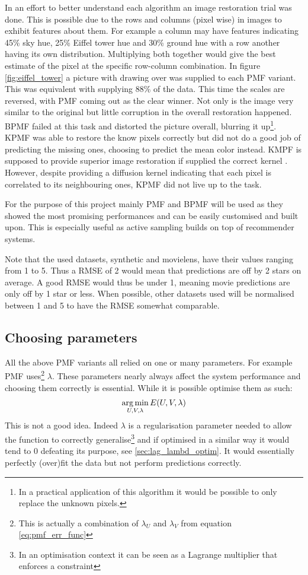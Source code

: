 In an effort to better understand each algorithm an image restoration trial was done. This is possible due to the rows and columns (pixel wise) in images to exhibit features about them. For example a column may have features indicating 45\% sky hue, 25\% Eiffel tower hue and 30\% ground hue with a row another having its own distribution. Multiplying both together would give the best estimate of the pixel at the specific row-column combination.
In figure \ref{fig:eiffel_tower} a picture with drawing over was supplied to each PMF variant. This was equivalent with supplying 88\% of the data. This time the scales are reversed, with PMF coming out as the clear winner. Not only is the image very similar to the original but little corruption in the overall restoration happened. BPMF failed at this task and distorted the picture overall, blurring it up\footnote{In a practical application of this algorithm it would be possible to only replace the unknown pixels.}. KPMF was able to restore the know pixels correctly but did not do a good job of predicting the missing ones, choosing to predict the mean color instead. KMPF is supposed to provide superior image restoration if supplied the correct kernel \cite{kpmf}. However, despite providing a diffusion kernel indicating that each pixel is correlated to its neighbouring ones, KPMF did not live up to the task.


For the purpose of this project mainly PMF and BPMF will be used as they showed the most promising performances and can be easily customised and built upon. This is especially useful as active sampling builds on top of recommender systems.

Note that the used datasets, synthetic and movielens, have their values ranging from 1 to 5. Thus a RMSE of 2 would mean that predictions are off by 2 stars on average. A good RMSE would thus be under 1, meaning movie predictions are only off by 1 star or less. When possible, other datasets used will be normalised between 1 and 5 to have the RMSE somewhat comparable.

\subsection{Choosing parameters}
All the above PMF variants all relied on one or many parameters. For example PMF uses\footnote{This is actually a combination of $\lambda_U$ and $\lambda_V$ from equation \ref{eq:pmf_err_func}} $\lambda$. These parameters nearly always affect the system performance and choosing them correctly is essential. While it is possible optimise them as such:
\begin{align*}
\underset{U,V,\lambda}{\operatorname*{arg\,min}}\, E(U,V,\lambda)
\end{align*}
This is not a good idea. Indeed $\lambda$ is a regularisation parameter needed to allow the function to correctly generalise\footnote{In an optimisation context it can be seen as a Lagrange multiplier that enforces a constraint} and if optimised in a similar way it would tend to 0 defeating its purpose, see \ref{sec:lag_lambd_optim}. It would essentially perfectly (over)fit the data but not perform predictions correctly. 

